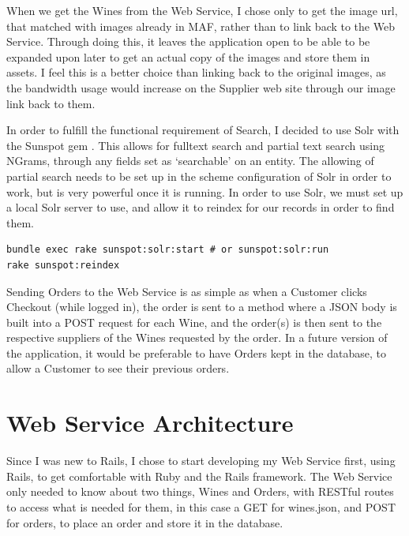 \documentclass[12pt]{article}
\begin{document}
When we get the Wines from the Web Service, I chose only to get the image url, that matched with images already in MAF, rather than to link back to the Web Service. Through doing this, it leaves the application open to be able to be expanded upon later to get an actual copy of the images and store them in assets. I feel this is a better choice than linking back to the original images, as the bandwidth usage would increase on the Supplier web site through our image link back to them.

In order to fulfill the functional requirement of Search, I decided to use Solr with the Sunspot gem \cite{solrsunspot}. This allows for fulltext search and partial text search using NGrams, through any fields set as `searchable' on an entity. The allowing of partial search needs to be set up in the scheme configuration of Solr in order to work, but is very powerful once it is running. In order to use Solr, we must set up a local Solr server to use, and allow it to reindex for our records in order to find them.
\begin{lstlisting}
bundle exec rake sunspot:solr:start # or sunspot:solr:run
rake sunspot:reindex
\end{lstlisting}

Sending Orders to the Web Service is as simple as when a Customer clicks Checkout (while logged in), the order is sent to a method where a JSON body is built into a POST request for each Wine, and the order(s) is then sent to the respective suppliers of the Wines requested by the order. In a future version of the application, it would be preferable to have Orders kept in the database, to allow a Customer to see their previous orders.


\section{Web Service Architecture}

Since I was new to Rails, I chose to start developing my Web Service first, using Rails, to get comfortable with Ruby and the Rails framework. The Web Service only needed to know about two things, Wines and Orders, with RESTful routes to access what is needed for them, in this case a GET for wines.json, and POST for orders, to place an order and store it in the database.
\end{document}
